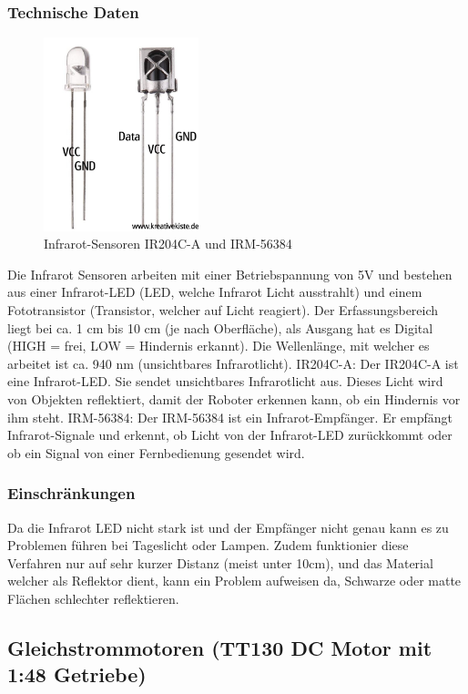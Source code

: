 \subsubsection{Technische Daten}
\begin{figure}[H]
    \centering
    \includegraphics[width=0.4\textwidth]{img/Hardware/Infrarot_Sensor.png}
    \caption{Infrarot-Sensoren IR204C-A und IRM-56384}
    \label{fig:infrarot_sensoren}
\end{figure}
Die Infrarot Sensoren arbeiten mit einer Betriebspannung von 5V und bestehen aus einer Infrarot-LED (LED, welche Infrarot Licht ausstrahlt) und 
einem Fototransistor (Transistor, welcher auf Licht reagiert). 
Der Erfassungsbereich liegt bei ca. 1 cm bis 10 cm (je nach Oberfläche), als Ausgang hat es Digital (HIGH = frei, LOW = Hindernis erkannt). 
Die Wellenlänge, mit welcher es arbeitet ist ca. 940 nm (unsichtbares Infrarotlicht).
IR204C-A:
Der IR204C-A ist eine Infrarot-LED. Sie sendet unsichtbares Infrarotlicht aus. 
Dieses Licht wird von Objekten reflektiert, damit der Roboter erkennen kann, ob ein Hindernis vor ihm steht.
IRM-56384:
Der IRM-56384 ist ein Infrarot-Empfänger. Er empfängt Infrarot-Signale und erkennt, ob Licht von der Infrarot-LED zurückkommt oder ob ein Signal von einer Fernbedienung gesendet wird.
\subsubsection{Einschränkungen}
Da die Infrarot LED nicht stark ist  und der Empfänger nicht genau kann es zu Problemen führen bei Tageslicht oder Lampen. 
Zudem funktionier diese Verfahren nur auf sehr kurzer Distanz (meist unter 10cm), und das Material welcher als Reflektor dient, kann ein Problem aufweisen da, 
Schwarze oder matte Flächen schlechter reflektieren.
%
\subsection{Gleichstrommotoren (TT130 DC Motor mit 1:48 Getriebe)}
%
